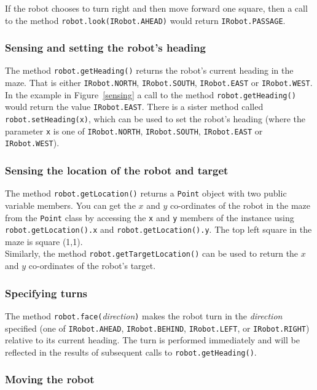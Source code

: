 \noindent
If the robot chooses to turn right and then move forward one square, 
then a call to the method {\tt robot.look(IRobot.AHEAD)} would
return {\tt IRobot.PASSAGE}.

\subsubsection{Sensing and setting the robot's heading}

The method {\tt robot.getHeading()} returns the robot's current heading
in the maze.
That is either {\tt IRobot.NORTH}, {\tt IRobot.SOUTH}, {\tt IRobot.EAST} or 
{\tt IRobot.WEST}. In the example in Figure~\ref{sensing} a call to the 
method {\tt robot.getHeading()} would return the value {\tt IRobot.EAST}.
There is a sister method called {\tt robot.setHeading(x)},
which can be used to set the robot's heading (where the parameter {\tt x} is 
one of {\tt IRobot.NORTH}, {\tt IRobot.SOUTH}, {\tt IRobot.EAST} or 
{\tt IRobot.WEST}).

\subsubsection{Sensing the location of the robot and target}

The method {\tt robot.getLocation()} returns a {\tt Point} object with two public
variable members. You can get the $x$ and $y$ co-ordinates of the robot in the maze from
the {\tt Point} class by accessing the {\tt x} and {\tt y} members of the instance
using {\tt robot.getLocation().x} and {\tt robot.getLocation().y}.  The top left square in the
maze is square (1,1).\\

\noindent
Similarly, the method {\tt robot.getTargetLocation()} can be used to return the $x$ and $y$
co-ordinates of the robot's target.

\subsubsection{Specifying turns}

The method {\tt robot.face(}{\em direction}{\tt )} makes the robot turn
 in the {\em direction} specified (one of {\tt IRobot.AHEAD}, {\tt IRobot.BEHIND}, 
{\tt IRobot.LEFT}, or {\tt IRobot.RIGHT}) relative to its current heading.  
The turn is
 performed immediately and will be reflected in the results of
 subsequent calls to {\tt robot.getHeading()}.

\subsubsection{Moving the robot}

